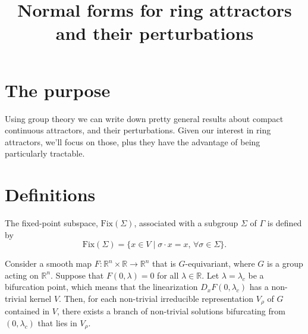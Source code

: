 \documentclass{scrartcl}
\title{Normal forms for ring attractors and their perturbations}
\author{}
\date{}
\begin{document}
  \maketitle
  \section{The purpose}
    Using group theory we can write down pretty general results about compact continuous attractors, and their perturbations.
    Given our interest in ring attractors, we'll focus on those, plus they have the advantage of being particularly tractable.
    
  \section{Definitions}
  \begin{definition}
  The fixed-point subspace, $\text{Fix}(\Sigma)$, associated with a subgroup $\Sigma$ of $\Gamma$ is defined by
\[
\text{Fix}(\Sigma) = \{ x \in V \mid \sigma \cdot x = x, \, \forall \sigma \in \Sigma \}.
\]
  \end{definition}
  
  \begin{theorem}
Consider a smooth map \( F: \mathbb{R}^n \times \mathbb{R} \to \mathbb{R}^n \) that is \( G \)-equivariant, where \( G \) is a group acting on \( \mathbb{R}^n \). Suppose that \( F(0, \lambda) = 0 \) for all \( \lambda \in \mathbb{R} \). Let \( \lambda = \lambda_c \) be a bifurcation point, which means that the linearization \( D_x F(0, \lambda_c) \) has a non-trivial kernel \( V \). 
Then, for each non-trivial irreducible representation \( V_\rho \) of \( G \) contained in \( V \), there exists a branch of non-trivial solutions bifurcating from \( (0, \lambda_c) \) that lies in \( V_\rho \).
\end{theorem}
  
\end{document}
